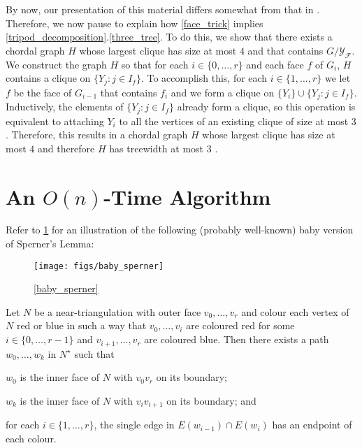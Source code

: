 \documentclass{patmorin}
\begin{document}
By now, our presentation of this material differs somewhat from that in \cite{dujmovic.joret.ea:planar,ueckerdt.wood.ea:improved}.  Therefore, we now pause to explain how \cref{face_trick} implies \cref{tripod_decomposition}.\ref{three_tree}.  To do this, we show that there exists a chordal graph $H$ whose largest clique has size at most $4$ and that contains $G/\mathcal{Y_F}$. We construct the graph $H$ so that for each $i\in\{0,\ldots,r\}$ and each face $f$ of $G_i$, $H$ contains a clique on $\{Y_j:j\in I_f\}$. To accomplish this, for each $i\in\{1,\ldots,r\}$ we let $f$ be the face of $G_{i-1}$ that contains $f_i$ and we form a clique on $\{Y_i\}\cup\{Y_j:j\in I_f\}$.  Inductively, the elements of $\{Y_j:j\in I_f\}$ already form a clique, so this operation is equivalent to attaching $Y_i$ to all the vertices of an existing clique of size at most $3$. Therefore, this results in a chordal graph $H$ whose largest clique has size at most $4$ and therefore $H$ has treewidth at most $3$ \cite{gavril:intersection}.

\section{An $O(n)$-Time Algorithm}
\label{linear_time_algorithm}\label{algorithm}

Refer to \cref{baby_sperner_fig} for an illustration of the following (probably well-known) baby version of Sperner's Lemma:

\begin{figure}
  \begin{center}
    \texttt{[image: figs/baby\_sperner]}
  \end{center}
  \caption{\cref{baby_sperner}}
  \label{baby_sperner_fig}
\end{figure}

\begin{lem}\label{baby_sperner}
  Let $N$ be a near-triangulation with outer face $v_0,\ldots,v_r$ and colour each vertex of $N$ red or blue in such a way that $v_0,\ldots,v_i$ are coloured red for some $i\in\{0,\ldots,r-1\}$ and $v_{i+1},\ldots,v_r$ are coloured blue.  Then there exists a path $w_0,\ldots,w_k$ in $N^\star$ such that
  \begin{compactenum}
    \item $w_0$ is the inner face of $N$ with $v_0v_r$ on its boundary;
    \item $w_k$ is the inner face of $N$ with $v_iv_{i+1}$ on its boundary; and
    \item for each $i\in\{1,\ldots,r\}$, the single edge in $E(w_{i-1})\cap E(w_i)$ has an endpoint of each colour.
  \end{compactenum}
\end{lem}
\end{document}
